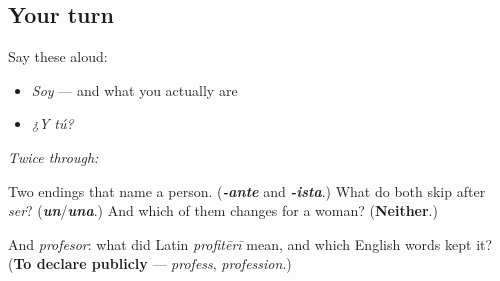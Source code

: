 \subsection*{Your turn}
Say these aloud:

\begin{itemize}
\raggedright
  \item \emph{Soy} — and what you actually are
  \item \emph{¿Y tú?}
\end{itemize}

\emph{Twice through:}

\begin{tcolorbox}[breakable,colback=teal!4,colframe=teal!35!black,title={Before you move on}]
Two endings that name a person. (\emph{\textbf{-ante}} and \emph{\textbf{-ista}}.) What do both skip after \emph{ser}? (\emph{\textbf{un}}/\emph{\textbf{una}}.) And which of them changes for a woman? (\textbf{Neither}.)

And \emph{profesor}: what did Latin \emph{profitērī} mean, and which English words kept it? (\textbf{To declare publicly} — \emph{profess}, \emph{profession}.)
\end{tcolorbox}
